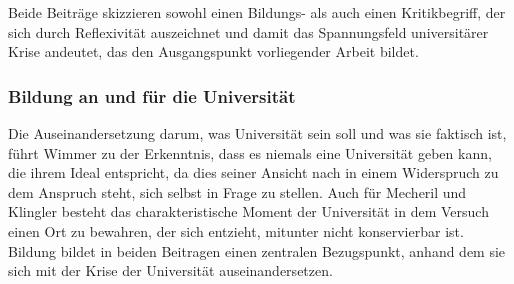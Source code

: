 \noindent Beide Beiträge skizzieren sowohl einen Bildungs- als auch einen Kritikbegriff, der sich durch
Reflexivität auszeichnet und damit das Spannungsfeld universitärer Krise
andeutet, das den Ausgangspunkt vorliegender Arbeit bildet. 

\subsubsection{Bildung an und für die Universität}

Die Auseinandersetzung darum, was Universität sein soll und was sie faktisch
ist, führt Wimmer zu der Erkenntnis, dass es niemals eine Universität geben
kann, die ihrem Ideal entspricht, da dies seiner Ansicht nach in einem
Widerspruch zu dem Anspruch steht, sich selbst in Frage zu
stellen.\footnotemark {} Auch für
Mecheril und Klingler besteht das charakteristische Moment der Universität in
dem Versuch einen Ort zu bewahren, \glqq der sich entzieht, mitunter nicht
konservierbar ist.\grqq\footnotemark {} Bildung bildet in beiden Beitragen einen zentralen
Bezugspunkt, anhand dem sie sich mit der Krise der Universität
auseinandersetzen.\\

